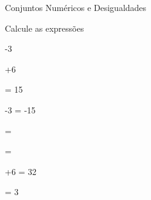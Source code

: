 \begin{exercicios}{Conjuntos Numéricos e Desigualdades}
    \begin{exercicio} %
        Calcule as expressões
        \begin{mathlist}[2]
            \item {}
            \item -3
            \item {}
            \item {}
            \item {}+6
            \item {}
        \end{mathlist}
        \begin{answers}
            \begin{mathlist}[2]
                \item {} = 15 
                \item -3 = -15 
                \item {} = 
                \item {} = 
                \item {}+6 = 32
                \item {} = 3
           \end{mathlist}
        \end{answers}        
    \end{exercicio}


\end{exercicios}
